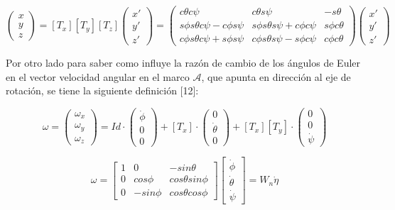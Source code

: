 \documentclass[\main/main.tex]{subfiles}
\begin{document}
\begin{equation}
\begin{pmatrix}x\\
y\\
z
\end{pmatrix}=[T_{x}][T_{y}][T_{z}]\begin{pmatrix}x'\\
y'\\
z'
\end{pmatrix}=\begin{pmatrix}c\theta c\psi & c\theta s\psi & -s\theta\\
s\phi s\theta c\psi-c\phi s\psi & s\phi s\theta s\psi+c\phi c\psi & s\phi c\theta\\
c\phi s\theta c\psi+s\phi s\psi & c\phi s\theta s\psi-s\phi c\psi & c\phi c\theta
\end{pmatrix}\begin{pmatrix}x'\\
y'\\
z'
\end{pmatrix}
\end{equation}

Por otro lado para saber como influye la razón de cambio de los ángulos
de Euler en el vector velocidad angular en el marco $\mathcal{A}$,
que apunta en dirección al eje de rotación, se tiene la siguiente
definición [12]:

\begin{equation}
\omega=\begin{pmatrix}\omega_{x}\\
\omega_{y}\\
\omega_{z}
\end{pmatrix}=Id\cdot\begin{pmatrix}\dot{\phi}\\
0\\
0
\end{pmatrix}+[T_{x}]\cdot\begin{pmatrix}0\\
\dot{\theta}\\
0
\end{pmatrix}+[T_{x}][T_{y}]\cdot\begin{pmatrix}0\\
0\\
\dot{\psi}
\end{pmatrix}
\end{equation}

\begin{equation}
\omega=\begin{bmatrix}1 & 0 & -sin\theta\\
0 & cos\phi & cos\theta sin\phi\\
0 & -sin\phi & cos\theta cos\phi
\end{bmatrix}\begin{bmatrix}\dot{\phi}\\
\dot{\theta}\\
\dot{\psi}
\end{bmatrix}=W_{n}\dot{\eta}
\end{equation}
\end{document}
